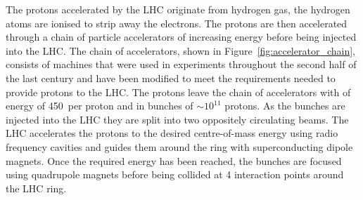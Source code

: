 The protons accelerated by the LHC originate from hydrogen gas, %
the hydrogen atoms are ionised to strip away the electrons. The protons are then accelerated through a chain of particle accelerators of increasing energy before being injected into the LHC. The chain of accelerators, shown in Figure~\ref{fig:accelerator_chain}, consists of machines that were used in experiments throughout the second half of the last century and have been modified to meet the requirements needed to provide protons to the LHC. The protons leave the chain of accelerators with of energy of 450~\gev per proton and in bunches of $\sim 10^{11}$ protons. As the bunches are injected into the LHC they are split into two oppositely circulating beams.
The LHC accelerates the protons to the desired centre-of-mass energy using radio frequency cavities and guides them around the ring with superconducting dipole magnets. %
Once the required energy has been reached, the bunches are focused using quadrupole magnets before being collided at 4 interaction points around the LHC ring.%

